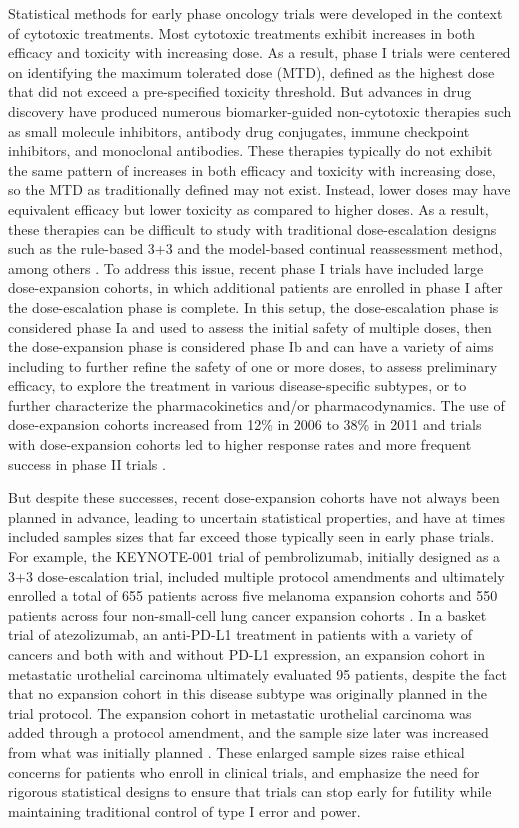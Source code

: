 Statistical methods for early phase oncology trials were developed in
the context of cytotoxic treatments. Most cytotoxic treatments exhibit
increases in both efficacy and toxicity with increasing dose. As a
result, phase I trials were centered on identifying the maximum
tolerated dose (MTD), defined as the highest dose that did not exceed a
pre-specified toxicity threshold. But advances in drug discovery have
produced numerous biomarker-guided non-cytotoxic therapies such as small
molecule inhibitors, antibody drug conjugates, immune checkpoint
inhibitors, and monoclonal antibodies. These therapies typically do not
exhibit the same pattern of increases in both efficacy and toxicity with
increasing dose, so the MTD as traditionally defined may not exist.
Instead, lower doses may have equivalent efficacy but lower toxicity as
compared to higher doses. As a result, these therapies can be difficult
to study with traditional dose-escalation designs such as the rule-based
3+3 and the model-based continual reassessment method, among others
\citep{Pestana2020}. To address this issue, recent phase I trials have
included large dose-expansion cohorts, in which additional patients are
enrolled in phase I after the dose-escalation phase is complete. In this
setup, the dose-escalation phase is considered phase Ia and used to
assess the initial safety of multiple doses, then the dose-expansion
phase is considered phase Ib and can have a variety of aims including to
further refine the safety of one or more doses, to assess preliminary
efficacy, to explore the treatment in various disease-specific subtypes,
or to further characterize the pharmacokinetics and/or pharmacodynamics.
The use of dose-expansion cohorts increased from 12\% in 2006 to 38\% in
2011 \citep{Manji2013} and trials with dose-expansion cohorts led to
higher response rates and more frequent success in phase II trials
\citep{Bugano2017}.

But despite these successes, recent dose-expansion cohorts have not
always been planned in advance, leading to uncertain statistical
properties, and have at times included samples sizes that far exceed
those typically seen in early phase trials. For example, the KEYNOTE-001
trial of pembrolizumab, initially designed as a 3+3 dose-escalation
trial, included multiple protocol amendments and ultimately enrolled a
total of 655 patients across five melanoma expansion cohorts and 550
patients across four non-small-cell lung cancer expansion cohorts
\citep{Khoja2015}. In a basket trial of atezolizumab, an anti-PD-L1
treatment in patients with a variety of cancers and both with and
without PD-L1 expression, an expansion cohort in metastatic urothelial
carcinoma ultimately evaluated 95 patients, despite the fact that no
expansion cohort in this disease subtype was originally planned in the
trial protocol. The expansion cohort in metastatic urothelial carcinoma
was added through a protocol amendment, and the sample size later was
increased from what was initially planned
\citep{Petrylak2018, Powles2014}. These enlarged sample sizes raise
ethical concerns for patients who enroll in clinical trials, and
emphasize the need for rigorous statistical designs to ensure that
trials can stop early for futility while maintaining traditional control
of type I error and power.

